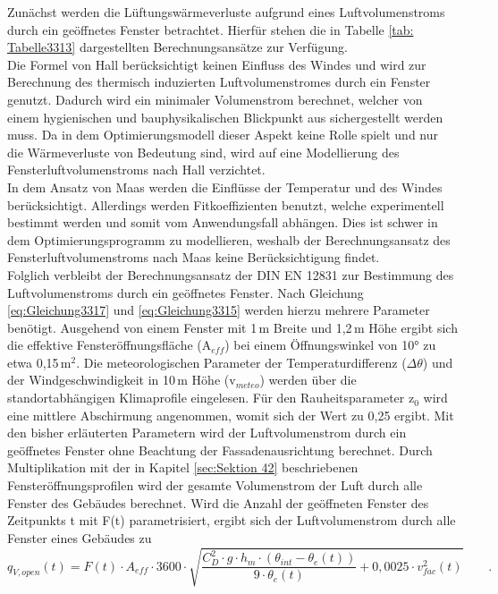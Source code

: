 Zunächst werden die Lüftungswärmeverluste aufgrund eines Luftvolumenstroms durch ein geöffnetes Fenster betrachtet.
Hierfür stehen die in Tabelle \ref{tab: Tabelle3313} dargestellten Berechnungsansätze zur Verfügung.\\
Die Formel von Hall berücksichtigt keinen Einfluss des Windes und wird zur Berechnung des thermisch induzierten Luftvolumenstromes durch ein Fenster genutzt.
Dadurch wird ein minimaler Volumenstrom berechnet, welcher von einem hygienischen und bauphysikalischen Blickpunkt aus sichergestellt werden muss.
Da in dem Optimierungsmodell dieser Aspekt keine Rolle spielt und nur die Wärmeverluste von Bedeutung sind, wird auf eine Modellierung des Fensterluftvolumenstroms nach Hall verzichtet.\\
In dem Ansatz von Maas werden die Einflüsse der Temperatur und des Windes berücksichtigt.
Allerdings werden Fitkoeffizienten benutzt, welche experimentell bestimmt werden und somit vom Anwendungsfall abhängen.
Dies ist schwer in dem Optimierungsprogramm zu modellieren, weshalb der Berechnungsansatz des Fensterluftvolumenstroms nach Maas keine Berücksichtigung findet.\\
Folglich verbleibt der Berechnungsansatz der DIN EN 12831 zur Bestimmung des Luftvolumenstroms durch ein geöffnetes Fenster.
Nach Gleichung \ref{eq:Gleichung3317} und \ref{eq:Gleichung3315} werden hierzu mehrere Parameter benötigt. 
Ausgehend von einem Fenster mit 1\,m Breite und 1,2\,m Höhe ergibt sich die effektive Fensteröffnungsfläche (A\(_{eff}\)) bei einem Öffnungswinkel von 10° zu etwa 0,15\,m\(^2\).
Die meteorologischen Parameter der Temperaturdifferenz (\(\Delta \theta\)) und der Windgeschwindigkeit in 10\,m Höhe (v\(_{meteo}\)) werden über die standortabhängigen Klimaprofile eingelesen.
Für den Rauheitsparameter z\(_0\) wird eine mittlere Abschirmung angenommen, womit sich der Wert zu 0,25 ergibt.
Mit den bisher erläuterten Parametern wird der Luftvolumenstrom durch ein geöffnetes Fenster ohne Beachtung der Fassadenausrichtung berechnet.
Durch Multiplikation mit der in Kapitel \ref{sec:Sektion 42} beschriebenen Fensteröffnungsprofilen wird der gesamte Volumenstrom der Luft durch alle Fenster des Gebäudes berechnet.
Wird die Anzahl der geöffneten Fenster des Zeitpunkts t mit F(t) parametrisiert, ergibt sich der Luftvolumenstrom durch alle Fenster eines Gebäudes zu
\begin{equation}
\label{eq:Gleichung511}
q_{V,open}(t) = F(t) \cdot A_{eff} \cdot 3600 \cdot \sqrt{\frac{C_{D}^2 \cdot g \cdot h_m \cdot ( \theta_{int} - \theta_{e}(t))}{9 \cdot \theta_{e}(t)} + 0,0025 \cdot v_{fac}^2(t)} \qquad \text{.}
\end{equation}


